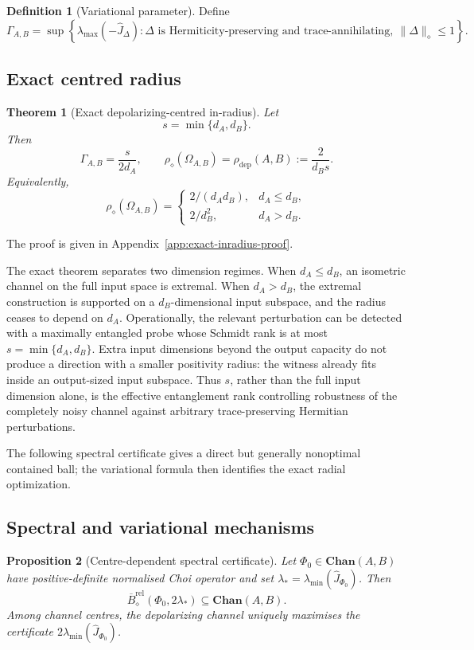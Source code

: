 \documentclass[11pt,a4paper]{article}
\theoremstyle{definition}
\newtheorem{definition}{Definition}[section]
\theoremstyle{plain}
\newtheorem{theorem}{Theorem}[section]
\newtheorem{proposition}[theorem]{Proposition}
\theoremstyle{remark}
\newcommand{\Chan}{\mathbf{Chan}}
\newcommand{\rhodep}{\rho_{\mathrm{dep}}}
\begin{document}
\begin{definition}[Variational parameter]
Define
\[
\Gamma_{A,B}
=\sup\left\{
\lambda_{\max}(-\widehat J_\Delta):
\Delta\text{ is Hermiticity-preserving and trace-annihilating},\
\|\Delta\|_\diamond\leq1
\right\}.
\]
\end{definition}

\subsection{Exact centred radius}

\begin{theorem}[Exact depolarizing-centred in-radius]
\label{thm:exact-inradius}
Let
\[
s=\min\{d_A,d_B\}.
\]
Then
\[
\Gamma_{A,B}=\frac{s}{2d_A},
\qquad
\rho_\diamond(\Omega_{A,B})
=\rhodep(A,B)
:=\frac{2}{d_Bs}.
\]
Equivalently,
\[
\rho_\diamond(\Omega_{A,B})
=
\begin{cases}
2/(d_Ad_B),&d_A\leq d_B,\\[2pt]
2/d_B^2,&d_A>d_B.
\end{cases}
\]
\end{theorem}

The proof is given in Appendix~\ref{app:exact-inradius-proof}.

The exact theorem separates two dimension regimes. When $d_A\leq d_B$,
an isometric channel on the full input space is extremal. When $d_A>d_B$,
the extremal construction is supported on a $d_B$-dimensional input
subspace, and the radius ceases to depend on $d_A$. Operationally, the
relevant perturbation can be detected with a maximally entangled probe whose
Schmidt rank is at most
$s=\min\{d_A,d_B\}$. Extra input dimensions beyond the output capacity do
not produce a direction with a smaller positivity radius: the witness already
fits inside an output-sized input subspace. Thus $s$, rather than the full input
dimension alone, is the effective entanglement rank controlling robustness
of the completely noisy channel against arbitrary trace-preserving Hermitian
perturbations.

The following spectral certificate gives a direct but generally nonoptimal
contained ball; the variational formula then identifies the exact radial
optimization.

\subsection{Spectral and variational mechanisms}

\begin{proposition}[Centre-dependent spectral certificate]
\label{prop:spectral-centre}
Let $\Phi_0\in\Chan(A,B)$ have positive-definite normalised Choi operator
and set $\lambda_*=\lambda_{\min}(\widehat J_{\Phi_0})$. Then
\[
\overline B^{\mathrm{rel}}_\diamond(\Phi_0,2\lambda_*)
\subseteq\Chan(A,B).
\]
Among channel centres, the depolarizing channel uniquely maximises the
certificate $2\lambda_{\min}(\widehat J_{\Phi_0})$.
\end{proposition}
\end{document}
